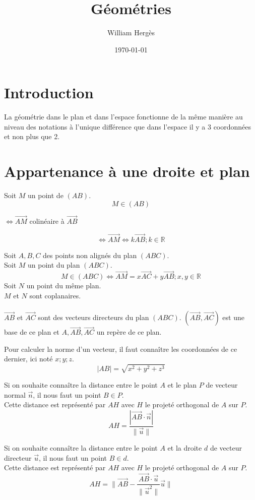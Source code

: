 \documentclass{article}
\title{Géométries}
\author{William Hergès}
\date{\today}
\begin{document}
	\maketitle

	\section{Introduction}

	La géométrie dans le plan et dans l'espace fonctionne de la même manière au niveau des notations à l'unique différence que dans l'espace il y a 3 coordonnées et non plus que 2.

	\section{Appartenance à une droite et plan}

	Soit $M$ un point de $(AB)$.
	\[M \in (AB) \] \begin{center} $\Leftrightarrow \vec{AM}$ colinéaire à $\vec{AB}$ \end{center}
	\[\Leftrightarrow \vec{AM} \Leftrightarrow k\vec{AB} ; k \in \mathbb{R}\]

	Soit $A,B,C$ des points non alignés du plan $(ABC)$. \\
	Soit $M$ un point du plan $(ABC)$.
	\[
		M \in (ABC) \Leftrightarrow \vec{AM} = x\vec{AC} + y\vec{AB} ; x,y \in \mathbb{R}
	\]
	Soit $N$ un point du même plan. \\
	$M$ et $N$ sont coplanaires. \\
	\\
	$\vec{AB}$ et $\vec{AC}$ sont des vecteurs directeurs du plan $(ABC)$. $(\vec{AB}, \vec{AC})$ est une base de ce plan et $A, \vec{AB}, \vec{AC}$ un repère de ce plan.

	Pour calculer la norme d'un vecteur, il faut connaître les coordonnées de ce dernier, ici noté $x;y;z$.
	\[ |AB| = \sqrt{x^2+y^2+z^3} \]

	Si on souhaite connaître la distance entre le point $A$ et le plan $P$ de vecteur normal $\vec{n}$, il nous faut un point $B \in P$. \\
	Cette distance est représenté par $AH$ avec $H$ le projeté orthogonal de $A$ sur $P$.
	\[ AH = \frac{|\vec{AB} \cdot \vec{n}|}{\|\vec{u}\|} \]

	Si on souhaite connaître la distance entre le point $A$ et la droite $d$ de vecteur directeur $\vec{u}$, il nous faut un point $B \in d$. \\
	Cette distance est représenté par $AH$ avec $H$ le projeté orthogonal de $A$ sur $P$.
	\[ AH = \|\vec{AB}-\frac{\vec{AB}\cdot\vec{u}}{\|\vec{u}^2\|}\vec{u}\| \]
\end{document}
